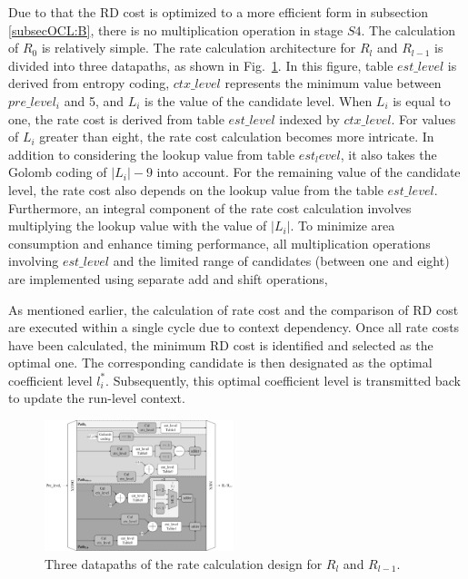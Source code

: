 \documentclass[lettersize,journal]{IEEEtran}
\begin{document}
Due to that the RD cost is optimized to a more efficient form in subsection \ref{subsecOCL:B}, there is no multiplication operation in stage $S4$. The calculation of $R_{0}$ is relatively simple. The rate calculation architecture for $R_{l}$ and $R_{l-1}$ is divided into three datapaths, as shown in Fig.~\ref{rate cost}. 
In this figure, table $est\_level$ is derived from entropy coding, $ctx\_level$ represents the minimum value between $pre\_level_i$ and 5, and $L_i$ is the value of the candidate level. 
When $L_i$ is equal to one, the rate cost is derived from table $est\_level$ indexed by $ctx\_level$. 
For values of $L_i$ greater than eight, the rate cost calculation becomes more intricate. 
In addition to considering the lookup value from table $est_level$, it also takes the Golomb coding of $\vert L_{i}\vert -9$ into account. 
For the remaining value of the candidate level, the rate cost also depends on the lookup value from the table $est\_level$. Furthermore, an integral component of the rate cost calculation involves multiplying the lookup value with the value of $\vert L_i\vert$. To minimize area consumption and enhance timing performance, all multiplication operations involving $est\_level$ and the limited range of candidates (between one and eight) are implemented using separate add and shift operations, 

As mentioned earlier, the calculation of rate cost and the comparison of RD cost are executed within a single cycle due to context dependency. Once all rate costs have been calculated, the minimum RD cost is identified and selected as the optimal one. The corresponding candidate is then designated as the optimal coefficient level $l_{i}^{*}$. Subsequently, this optimal coefficient level is transmitted back to update the run-level context. 

\begin{figure}[!h]
	\centering
	\centerline{\includegraphics[width=0.49\textwidth]{pic_pan/rate_calculation.png}} 
	\caption{Three datapaths of the rate calculation design for $R_{l}$ and $R_{l-1}$.}
	\label{rate cost} %
\end{figure}
\end{document}
